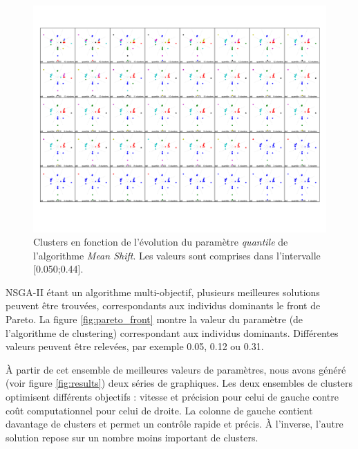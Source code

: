 \documentclass{llncs}
\begin{document}
\begin{figure}[ht]
  \begin{center}
  \includegraphics[width=\textwidth]{figures/DS2_MS.pdf}
    \caption{Clusters en fonction de l'évolution du paramètre \textit{quantile} de l'algorithme \textit{Mean Shift}. Les valeurs sont comprises dans l'intervalle [0.050;0.44].}
  \label{fig:validation}
  \end{center}
\end{figure}

NSGA-II étant un algorithme multi-objectif, plusieurs meilleures solutions peuvent être trouvées, correspondants aux individus dominants le front de Pareto.
La figure \ref{fig:pareto_front} montre la valeur du paramètre (de l'algorithme de clustering) correspondant aux individus dominants.
Différentes valeurs peuvent être relevées, par exemple 0.05, 0.12 ou 0.31.

À partir de cet ensemble de meilleures valeurs de paramètres, nous avons généré (voir figure \ref{fig:results}) deux séries de graphiques.
Les deux ensembles de clusters optimisent différents objectifs : vitesse et précision pour celui de gauche contre coût computationnel pour celui de droite.
La colonne de gauche contient davantage de clusters et permet un contrôle rapide et précis.
À l'inverse, l'autre solution repose sur un nombre moins important de clusters.
\end{document}
